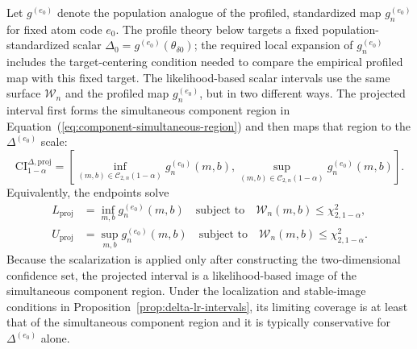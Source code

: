 \documentclass[11pt]{article}
\begin{document}
Let $g^{(e_0)}$ denote the population analogue of the profiled, standardized map $g_n^{(e_0)}$ for fixed atom code $e_0$. The profile theory below targets a fixed population-standardized scalar $\Delta_0=g^{(e_0)}(\theta_{\delta0})$; the required local expansion of $g_n^{(e_0)}$ includes the target-centering condition needed to compare the empirical profiled map with this fixed target.
The likelihood-based scalar intervals use the same surface $\mathcal{W}_n$ and the profiled map $g_n^{(e_0)}$, but in two different ways. The projected interval first forms the simultaneous component region in Equation~(\ref{eq:component-simultaneous-region}) and then maps that region to the $\Delta^{(e_0)}$ scale:
\begin{equation}
  \mathrm{CI}^{\Delta,\mathrm{proj}}_{1-\alpha}
  =
  \left[
    \inf_{(m,b)\in\mathcal{C}_{2,n}(1-\alpha)}
    g_n^{(e_0)}(m,b),
    \sup_{(m,b)\in\mathcal{C}_{2,n}(1-\alpha)}
    g_n^{(e_0)}(m,b)
  \right].
  \label{eq:projected-delta-ci}
\end{equation}
Equivalently, the endpoints solve
\begin{align}
  L_{\mathrm{proj}}
  &=
  \inf_{m,b} g_n^{(e_0)}(m,b)
  \quad\text{subject to}\quad
  \mathcal{W}_n(m,b)\leq\chi^2_{2,1-\alpha},
  \label{eq:projected-delta-lower}\\
  U_{\mathrm{proj}}
  &=
  \sup_{m,b} g_n^{(e_0)}(m,b)
  \quad\text{subject to}\quad
  \mathcal{W}_n(m,b)\leq\chi^2_{2,1-\alpha}.
  \label{eq:projected-delta-upper}
\end{align}
Because the scalarization is applied only after constructing the two-dimensional confidence set, the projected interval is a likelihood-based image of the simultaneous component region. Under the localization and stable-image conditions in Proposition~\ref{prop:delta-lr-intervals}, its limiting coverage is at least that of the simultaneous component region and it is typically conservative for $\Delta^{(e_0)}$ alone.
\end{document}

